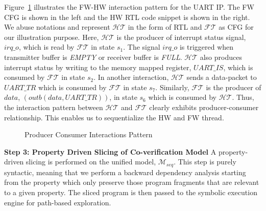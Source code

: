 \documentclass[sigconf]{acmart}
\newcommand{\tool}[1]{\textsc{#1}\xspace}
\newcommand{\verifox}{\tool{CoVeriIf}}
\newcommand{\Omit}[1]{}
\begin{document}
Figure~\ref{fig:interleaving1} illustrates the FW-HW interaction pattern 
for the UART IP. The FW CFG is shown in the left and the 
HW RTL code snippet is shown in the right. We abuse notations and 
represent $\mathcal{HT}$ in the form of RTL and $\mathcal{FT}$ as CFG
for our illustration purpose. Here, $\mathcal{HT}$ is the producer of interrupt 
status signal, $irq\_o$, which is read by $\mathcal{FT}$ in state $s_1$. 
The signal $irq\_o$ is  triggered when transmitter buffer is 
{\em EMPTY} or receiver buffer is {\em FULL}. 
$\mathcal{HT}$ also produces interrupt status by writing to the 
memory mapped register, $UART\_IS$, which is consumed by 
$\mathcal{FT}$ in state $s_2$.  In another interaction, $\mathcal{HT}$
sends a data-packet to $UART\_TR$ which is consumed by $\mathcal{FT}$ in state $s_7$.
Similarly, $\mathcal{FT}$ is the producer of $data$, $(outb(data,UART\_TR))$, 
in state $s_6$ which is consumed by $\mathcal{HT}$. Thus, the interaction
pattern between $\mathcal{HT}$ and $\mathcal{FT}$ clearly exhibits producer-consumer
relationship. This enables us to sequentialize the HW and FW thread. \\
%
\begin{figure}[t]
\caption{Producer Consumer Interactions Pattern
\label{fig:interleaving1}}
\end{figure}
%
\textbf{Step 3: Property Driven Slicing of Co-verification Model}
A property-driven slicing is performed on the unified model, $\mathcal{M}_{seq}$.  
This step is purely syntactic, meaning that we perform a backward dependency 
analysis starting from the property which only preserve those 
program fragments that are relevant to a given property. The sliced program 
is then passed to the symbolic execution engine for path-based exploration. \\
%
\end{document}

